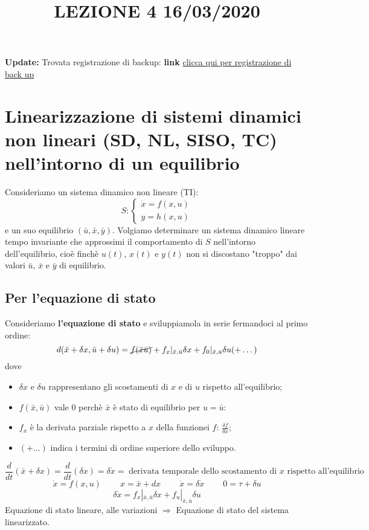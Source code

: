 \newpage
\title{LEZIONE 4 16/03/2020} \newline
\textbf{Update:} Trovata registrazione di backup: \textbf{link} \href{https://onedrive.live.com/?authkey=%21AATVJK3srNwxGzs&id=EE092FF4FF7B5B0E%212158&cid=EE092FF4FF7B5B0E}{clicca qui per registrazione di back up}
\section{Linearizzazione di sistemi dinamici non lineari (SD, NL, SISO, TC) nell'intorno di un equilibrio}
Consideriamo un sistema dinamico non lineare (TI):
\[
    S: \begin{cases}
        \dot{x} = f(x,u)\\
        y = h(x,u)
    \end{cases}
\]
e un suo equilibrio $(\bar{u}, \bar{x}, \bar{y})$.\newline
\newline
Volgiamo determinare un sistema dinamico lineare tempo invariante che approssimi il comportamento di $S$ nell'intorno dell'equilibrio, cioè finchè $u(t)$, $x(t)$ e $y(t)$ non si discostano "troppo" dai valori $\bar{u}$, $\bar{x}$ e $\bar{y}$ di equilibrio.
\subsection{Per l'equazione di stato}
Consideriamo \textbf{l'equazione di stato} e sviluppiamola in serie fermandoci al primo ordine:
\[
    d(\bar{x} + \delta x, \bar{u} + \delta u) = \cancel{ f(\bar{x} \bar{u})} + f_x|_{\bar{x}, \bar{u}}\delta x + f_0|_{\bar{x}, \bar{u}} \delta u (+ \dots)
\]
dove
\begin{itemize}
    \item $\delta x$ e $\delta u$ rappresentano gli scostamenti di $x$ e di $u$ rispetto all'equilibrio;
    \item $f(\bar{x}, \bar{u})$ vale $0$ perchè $\bar{x}$ è stato di equilibrio per $u = \bar{u}$:
    \item $f_x$ è la derivata parziale rispetto a $x$ della funzionei $f$: $\frac{\delta f}{\delta x}$;
    \item $(+ ...)$ indica i termini di ordine superiore dello sviluppo.
\end{itemize}
\[
    \frac{d}{dt} (\bar{x} + \delta x) = \frac{d}{dt} (\delta x) = \delta \dot{x} = \; \text{derivata temporale dello scostamento di $x$ rispetto all'equilibrio}\;
\]
\[
    \dot{x} = f(x,u) \;\;\;\;\;\;\;\; x = \bar{x} + dx \;\;\;\;\;\;\;\; \dot{x} = \delta \dot{x} \;\;\;\;\;\;\;\; 0 = \tau + \delta u
\]
\[
    \delta \dot{x} = f_x|_{\bar{x}, \bar{u}} \delta x + f_u |_{\bar{x}, \bar{u}} \delta u
\]
Equazione di stato lineare, alle variazioni $\Longrightarrow$ Equazione di stato del sistema linearizzato.
